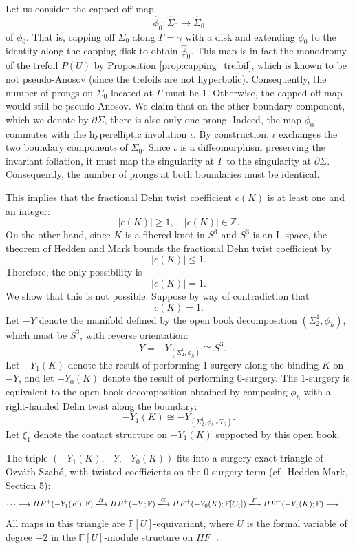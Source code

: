 \begin{myproof}
    Let us consider the capped-off map
    \[
    \widehat{\phi}_0 \colon \widehat{\Sigma}_0 \to \widehat{\Sigma}_0
    \]
    of $\phi_0$. That is, capping off $\Sigma_0$ along $\Gamma = \gamma$ with a disk and extending $\phi_0$ to the identity along the capping disk to obtain $\widehat{\phi}_0$. This map is in fact the monodromy of the trefoil $P(U)$ by Proposition \ref{prop:capping_trefoil}, which is known to be not pseudo-Anosov (since the trefoils are not hyperbolic). Consequently, the number of prongs on $\Sigma_0$ located at $\Gamma$ must be 1. Otherwise, the capped off map would still be pseudo-Anosov. We claim that on the other boundary component, which we denote by $\partial \Sigma$, there is also only one prong. Indeed, the map $\phi_0$ commutes with the hyperelliptic involution $\iota$. By construction, $\iota$ exchanges the two boundary components of $\Sigma_0$. Since $\iota$ is a diffeomorphism preserving the invariant foliation, it must map the singularity at $\Gamma$ to the singularity at $\partial \Sigma$. Consequently, the number of prongs at both boundaries must be identical.

    This implies that the fractional Dehn twist coefficient $c(K)$ is at least one and an integer:
    \[
    |c(K)| \geq 1, \quad |c(K)| \in \mathbb{Z}.
    \]
    On the other hand, since $K$ is a fibered knot in $S^3$ and $S^3$ is an L-space, the theorem of Hedden and Mark\cite{hedden2018floer} bounds the fractional Dehn twist coefficient by
    \[
    |c(K)| \leq 1.
    \]
    Therefore, the only possibility is
    \[
    |c(K)| = 1.
    \]
    We show that this is not possible. Suppose by way of contradiction that
    \[
    c(K) = 1.
    \]
    Let $-Y$ denote the manifold defined by the open book decomposition $(\Sigma_2^1, \phi_h)$, which must be $S^3$, with reverse orientation:
    \[
    -Y = -Y_{(\Sigma_2^1,\phi_h)} \cong S^3.
    \]
    Let $-Y_1(K)$ denote the result of performing $1$-surgery along the binding $K$ on $-Y$, and let $-Y_0(K)$ denote the result of performing $0$-surgery. The $1$-surgery is equivalent to the open book decomposition obtained by composing $\phi_h$ with a right-handed Dehn twist along the boundary:
    \[
    -Y_1(K) \cong -Y_{(\Sigma_2^1,\phi_h \circ T_\partial)}.
    \]
    Let $\xi_1$ denote the contact structure on $-Y_1(K)$ supported by this open book.

    The triple $(-Y_1(K),-Y,-Y_0(K))$ fits into a surgery exact triangle of Ozv\'{a}th-Szab\'{o}, with twisted coefficients on the $0$-surgery term (cf.\ Hedden-Mark\cite{hedden2018floer}, Section 5):
    \[
    \dots \longrightarrow HF^+(-Y_1(K);\mathbb{F}) \xlongrightarrow{H} HF^+(-Y;\mathbb{F}) \xlongrightarrow{G} HF^+(-Y_0(K);\mathbb{F}[C_1]) \xlongrightarrow{F} HF^+(-Y_1(K);\mathbb{F}) \longrightarrow \dots
    \]
    All maps in this triangle are $\mathbb{F}[U]$-equivariant, where $U$ is the formal variable of degree $-2$ in the $\mathbb{F}[U]$-module structure on $HF^+$.


\end{myproof}
